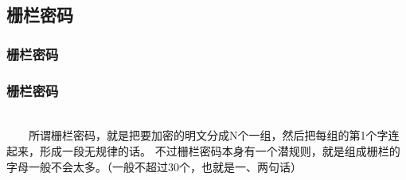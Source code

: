 \documentclass[slidestop,compress,mathserif]{beamer}
\begin{document}
%
%
%


\subsection{\hfill 栅栏密码}
\begin{frame}
  \frametitle{栅栏密码}
\end{frame}
\begin{frame}
  \transwipe
  \frametitle{栅栏密码}
  ~\\[1.6cm]
    ~~~~所谓栅栏密码，就是把要加密的明文分成N个一组，然后把每组的第1个字连起来，形成一段无规律的话。 不过栅栏密码本身有一个潜规则，就是组成栅栏的字母一般不会太多。（一般不超过30个，也就是一、两句话）
\end{frame}

\end{document}
